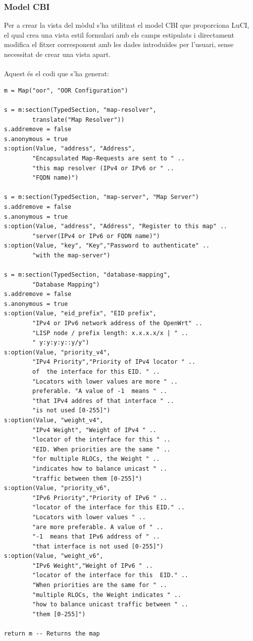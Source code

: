 \documentclass[11pt]{article}
\begin{document}
\subsubsection{Model CBI}
Per a crear la vista del mòdul s’ha utilitzat el model CBI que proporciona LuCI, el qual crea una vista estil formulari amb els camps estipulats i directament modifica el fitxer corresponent amb les dades introduïdes per l’usuari, sense necessitat de crear una vista apart.\\
\\
Aquest és el codi que s'ha generat:\\
\lstset{caption=Model CBI de la interfície LuCI}
\begin{lstlisting}[frame=single]
m = Map("oor", "OOR Configuration")

s = m:section(TypedSection, "map-resolver",
		translate("Map Resolver"))
s.addremove = false
s.anonymous = true
s:option(Value, "address", "Address",
		"Encapsulated Map-Requests are sent to " ..
		"this map resolver (IPv4 or IPv6 or " ..
		"FQDN name)")

s = m:section(TypedSection, "map-server", "Map Server")
s.addremove = false
s.anonymous = true
s:option(Value, "address", "Address", "Register to this map" ..
		"server(IPv4 or IPv6 or FQDN name)")
s:option(Value, "key", "Key","Password to authenticate" ..
		"with the map-server")

s = m:section(TypedSection, "database-mapping",
		"Database Mapping")
s.addremove = false
s.anonymous = true
s:option(Value, "eid_prefix", "EID prefix", 
		"IPv4 or IPv6 network address of the OpenWrt" ..
		"LISP node / prefix length: x.x.x.x/x | " ..
		" y:y:y:y::y/y")
s:option(Value, "priority_v4",
		"IPv4 Priority","Priority of IPv4 locator " ..
		of	the interface for this EID. " ..
		"Locators with lower values are more " ..
		preferable. "A value of -1  means " ..
		"that IPv4 addres of that interface " ..
		"is not used [0-255]")
s:option(Value, "weight_v4", 
		"IPv4 Weight", "Weight of IPv4 " ..
		"locator of the	interface for this " ..
		"EID. When priorities are the same " ..
		"for multiple RLOCs, the Weight " ..
		"indicates how to balance unicast " ..
		"traffic between them [0-255]")
s:option(Value, "priority_v6",
		"IPv6 Priority","Priority of IPv6 " ..
		"locator of the interface for this EID." ..
		"Locators with lower values " ..
		"are more preferable. A value of " ..
		"-1  means that IPv6 address of " ..
		"that interface is not used [0-255]")
s:option(Value, "weight_v6", 
		"IPv6 Weight","Weight of IPv6 " ..
		"locator of the interface for this  EID." ..
		"When priorities are the same for " ..
		"multiple RLOCs, the Weight indicates " ..
		"how to balance unicast traffic between " ..
		"them [0-255]")

return m -- Returns the map
\end{lstlisting}
\end{document}

